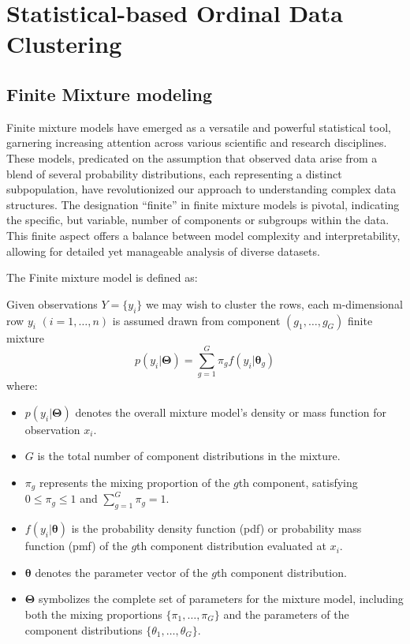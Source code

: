 \documentclass{article}
\begin{document}
\section{Statistical-based Ordinal Data Clustering}

\subsection{Finite Mixture modeling}

Finite mixture models have emerged as a versatile and powerful statistical tool, garnering increasing attention across various scientific and research disciplines. These models, predicated on the assumption that observed data arise from a blend of several probability distributions, each representing a distinct subpopulation, have revolutionized our approach to understanding complex data structures. The designation ``finite'' in finite mixture models is pivotal, indicating the specific, but variable, number of components or subgroups within the data. This finite aspect offers a balance between model complexity and interpretability, allowing for detailed yet manageable analysis of diverse datasets.

The Finite mixture model is defined as:

Given observations $Y = \{y_{i}\}$ we may wish to cluster the rows,
each m-dimensional row $y_i$ $(i = 1, \dots , n) $ is assumed drawn from component $(g_1, \dots, g_G)$ finite mixture
\begin{equation}
p(y_i|\mathbf{\Theta}) = \sum_{g=1}^{G} \pi_g f(y_i|\boldsymbol{\theta}_g)
\end{equation}
where:
\begin{itemize}
    \item $p(y_i|\mathbf{\Theta})$ denotes the overall mixture model's density or mass function for observation $x_i$.
    \item $G$ is the total number of component distributions in the mixture.
    \item $\pi_g$ represents the mixing proportion of the $g$th component, satisfying $0 \leq \pi_g \leq 1$ and $\sum_{g=1}^{G} \pi_g = 1$.
    \item $f(y_i|\boldsymbol{\theta})$ is the probability density function (pdf) or probability mass function (pmf) of the $g$th component distribution evaluated at $x_i$.
    \item $\boldsymbol{\theta}$ denotes the parameter vector of the $g$th component distribution.
    \item $\mathbf{\Theta}$ symbolizes the complete set of parameters for the mixture model, including both the mixing proportions $\{\pi_1, \ldots, \pi_G\}$ and the parameters of the component distributions $\{\theta_1, \ldots, \theta_G\}$.
\end{itemize}
\end{document}
